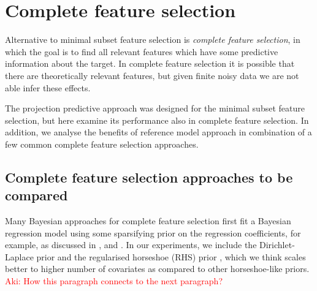 \documentclass[american,]{article}
\theoremstyle{definition}
\newcommand{\note}[1]{\textcolor{red}{#1}}
\begin{document}
\section{Complete feature selection}\label{comparison}

Alternative to minimal subset feature selection is \emph{complete
  feature selection}, in which the goal is to find all relevant
features which have some predictive information about the target. In
complete feature selection it is possible that there are theoretically
relevant features, but given finite noisy data we are not able infer
these effects.

The projection predictive approach was designed for the minimal subset
feature selection, but here examine its performance also in complete
feature selection. In addition, we analyse the benefits of reference
model approach in combination of a few common complete feature
selection approaches. 

\subsection{Complete feature selection approaches to be compared}

Many Bayesian approaches for complete feature selection first fit a
Bayesian regression model using some sparsifying prior on the
regression coefficients, for example, as discussed in
\cite{paper:dirichlet_laplace}, \cite{bhadra2017horseshoe+} and
\cite{johnstone2004needles}.  In our experiments, we include the
Dirichlet-Laplace \cite[DL;][]{paper:dirichlet_laplace} prior and the
regularised horseshoe (RHS) prior \citep{paper:rhs}, which we think
scales better to higher number of covariates as compared to other
horseshoe-like priors.
\note{Aki: How this paragraph connects to the next paragraph?}

\end{document}
